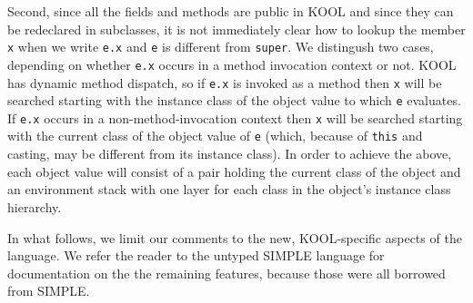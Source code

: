 \begin{latexComment}
Second, since all the fields and methods are public in KOOL and since
they can be redeclared in subclasses, it is not immediately
clear how to lookup the member \texttt{x} when we write \texttt{e.x}
and \texttt{e} is different from \texttt{super}.
We distingush two cases, depending on whether \texttt{e.x} occurs in a
method invocation context or not.  KOOL has dynamic method
dispatch, so if \texttt{e.x} is invoked as a method then \texttt{x}
will be searched starting with the instance class of the object value
to which \texttt{e} evaluates.  If \texttt{e.x} occurs in a
non-method-invocation context then \texttt{x} will be searched
starting with the current class of the object value of \texttt{e}
(which, because of \texttt{this} and casting, may be different from
its instance class).  In order to achieve the above, each object value
will consist of a pair holding the current class of the object and an
environment stack with one layer for each class in the object's
instance class hierarchy.

In what follows, we limit our comments to the new, KOOL-specific aspects of the
language.  We refer the reader to the untyped SIMPLE language for documentation
on the the remaining features, because those were all borrowed from SIMPLE.
\end{latexComment}

\vspace*{3ex}
